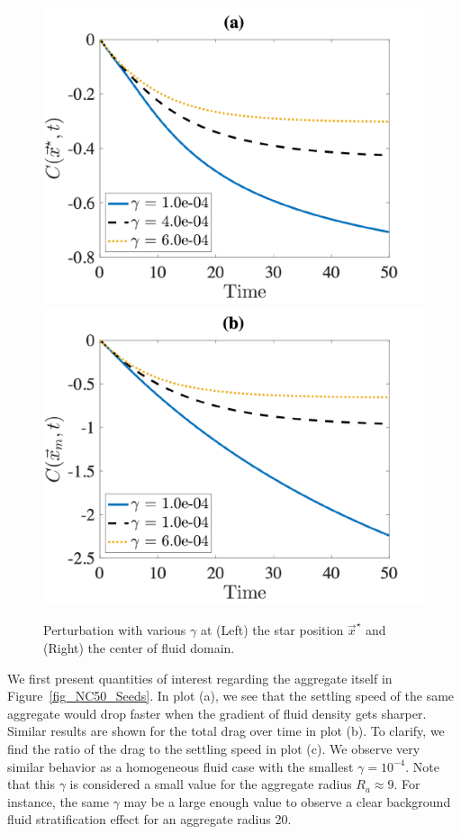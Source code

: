 \begin{figure}[ht]
	\begin{center}
		\includegraphics[scale=0.35]{./figures/fig_NC50_g_C_star.pdf}
		\includegraphics[scale=0.35]{./figures/fig_NC50_g_C_M}
	\caption{Perturbation with various $\gamma$ at (Left) the star position $\vec{x}^{\star}$ and (Right) the center of fluid domain.}
	\label{fig_NC50_gCM}
\end{center}
\end{figure}
\par
We first present quantities of interest regarding the aggregate itself in Figure~\ref{fig_NC50_Seeds}. In plot (a), we see that the settling speed of the same aggregate would drop faster when the gradient of fluid density gets sharper. Similar results are shown for the total drag over time in plot (b). To clarify, we find the ratio of the drag to the settling speed in plot (c). We observe very similar behavior as a homogeneous fluid case with the smallest $\gamma = 10^{-4}$. Note that this $\gamma$ is considered a small value for the aggregate radius $R_a \approx 9$. For instance, the same $\gamma$ may be a large enough value to observe a clear background fluid stratification effect for an aggregate radius 20.
